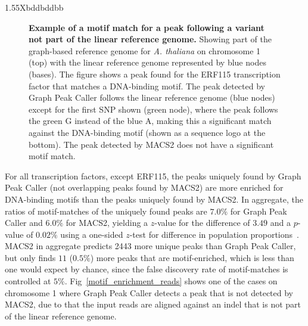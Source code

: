 \documentclass[10pt,letterpaper]{article}
\begin{document}
\begin{table}[!ht]
\begin{adjustwidth}{-2.45in}{0in}
\begin{tabularx}{1.55\textwidth}{Xbddbddbb}
\end{tabularx}
\end{adjustwidth}
\end{table}


\begin{figure}
 \caption{{\bf Example of a motif match for a peak following a variant not part of the linear reference genome.} Showing part of the graph-based reference genome for \emph{A. thaliana} on chromosome 1 (top) with the linear reference genome represented by blue nodes (bases). The figure shows a peak found for the ERF115 transcription
factor that matches a DNA-binding motif. The peak detected by Graph Peak Caller follows the linear reference genome (blue nodes) except for the first SNP shown (green node), where the peak follows the green G instead of the blue A, making this a significant match against the DNA-binding motif (shown as a sequence logo at the bottom). The peak detected by MACS2 does not have a significant motif match.}
\label{motif_enrichment}
\end{figure}


For all transcription factors, except ERF115, the peaks uniquely found by Graph Peak Caller (not overlapping peaks found by MACS2) are more enriched for DNA-binding motifs than the peaks uniquely found by MACS2. In aggregate, the ratios of motif-matches of the uniquely found peaks are $7.0\%$ for Graph Peak Caller and $6.0\%$ for MACS2, yielding a $z$-value for the difference of $3.49$ and a $p$-value of $0.02\%$ using a one-sided $z$-test for difference in population proportions~\cite{devoreberk}. MACS2 in aggregate predicts 2443 more unique peaks than Graph Peak Caller, but only finds $11$ ($0.5\%$) more peaks that are motif-enriched, which is less than one would expect by chance, since the false discovery rate of motif-matches is controlled at $5\%$. Fig~\ref{motif_enrichment_reads} shows one of the cases on chromosome 1 where Graph Peak Caller detects a peak that is not detected by MACS2, due to that the input reads are aligned against an indel that is not part of the linear reference genome. 
\end{document}
